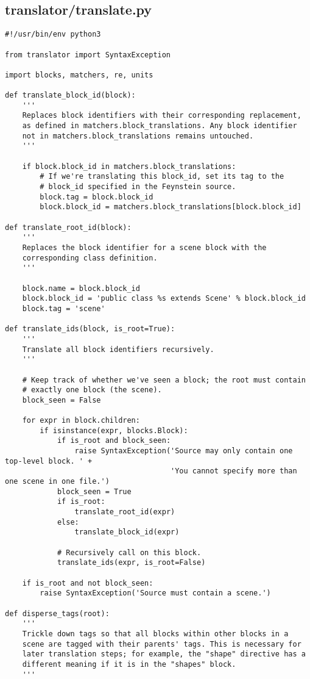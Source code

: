 \subsection*{translator/translate.py}
\begin{lstlisting}
#!/usr/bin/env python3

from translator import SyntaxException

import blocks, matchers, re, units

def translate_block_id(block):
    '''
    Replaces block identifiers with their corresponding replacement,
    as defined in matchers.block_translations. Any block identifier
    not in matchers.block_translations remains untouched.
    '''

    if block.block_id in matchers.block_translations:
        # If we're translating this block_id, set its tag to the
        # block_id specified in the Feynstein source.
        block.tag = block.block_id
        block.block_id = matchers.block_translations[block.block_id]

def translate_root_id(block):
    '''
    Replaces the block identifier for a scene block with the
    corresponding class definition.
    '''

    block.name = block.block_id
    block.block_id = 'public class %s extends Scene' % block.block_id
    block.tag = 'scene'

def translate_ids(block, is_root=True):
    '''
    Translate all block identifiers recursively.
    '''

    # Keep track of whether we've seen a block; the root must contain
    # exactly one block (the scene).
    block_seen = False

    for expr in block.children:
        if isinstance(expr, blocks.Block):
            if is_root and block_seen:
                raise SyntaxException('Source may only contain one top-level block. ' +
                                      'You cannot specify more than one scene in one file.')
            block_seen = True
            if is_root:
                translate_root_id(expr)
            else:
                translate_block_id(expr)

            # Recursively call on this block.
            translate_ids(expr, is_root=False)

    if is_root and not block_seen:
        raise SyntaxException('Source must contain a scene.')

def disperse_tags(root):
    '''
    Trickle down tags so that all blocks within other blocks in a
    scene are tagged with their parents' tags. This is necessary for
    later translation steps; for example, the "shape" directive has a
    different meaning if it is in the "shapes" block.
    '''


\end{lstlisting}
